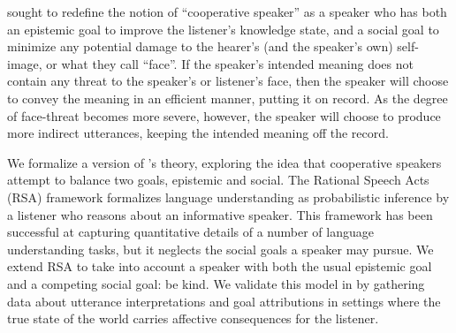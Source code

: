 \documentclass[10pt,letterpaper]{article}
\begin{document}
 sought to redefine the notion of ``cooperative speaker'' as a speaker 
who has both an epistemic goal to improve the listener's knowledge state, 
and a social goal to minimize any potential damage to the hearer's (and the speaker's own) self-image, or what they call ``face''.
If the speaker's intended meaning does not contain any threat to the speaker's or listener's face, 
then the speaker will choose to convey the meaning in an efficient manner, putting it on record. 
As the degree of face-threat becomes more severe, however, 
the speaker will choose to produce more indirect utterances, keeping the intended meaning off the record.

We formalize a version of 's theory, exploring the idea that cooperative speakers attempt to balance two goals, epistemic and social.
The Rational Speech Acts (RSA) framework \cite{Frank2012, Goodman2013} formalizes language understanding as probabilistic inference by a listener who reasons about an informative speaker. This framework has been successful at capturing quantitative details of a number of language understanding tasks, but it neglects the social goals a speaker may pursue. 
We extend RSA to take into account a speaker with both the usual epistemic goal and a competing social goal: be kind.
We validate this model in by gathering data about utterance interpretations and goal attributions in settings where the true state of the world carries affective consequences for the listener.

\end{document}
